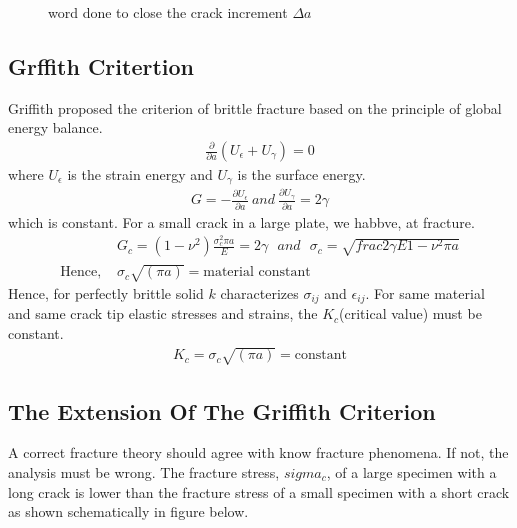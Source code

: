 \documentclass[11pt]{article}
\begin{document}
\begin{figure}[H]
    \centering
    \captionsetup{labelformat=empty}
    \caption{word done to close the crack increment $\Delta a$}
    
\end{figure}




\subsection{Grffith Critertion}
Griffith proposed the criterion of brittle fracture based on the principle of global energy balance.
\begin{align}
    \frac{\partial}{\partial a}(U_\epsilon + U_\gamma) = 0 \tag{5} \label{5}
\end{align}
where $U_\epsilon$  is the strain energy and $U_\gamma$ is the surface energy.
\begin{align*}
    G = -\frac{\partial U_\epsilon}{\partial a} \ and \ \frac{\partial U_\gamma}{\partial a} = 2 \gamma
\end{align*}
which is constant. For a small crack in a large plate, we habbve, at fracture.
\begin{align*}
    &G_c = (1 - \nu ^ 2)\frac{\sigma_{c} ^ 2 \pi a}{E} = 2 \gamma \ \ \ and \ \ \ \sigma_c = \sqrt{frac{2 \gamma E}{1 - \nu ^ 2 } \pi a}
    \\\text{Hence, \ \ \ \ \ \ \ \ \ \ \ \ \ } & \sigma_c \sqrt{(\pi a)} = \text{material constant}
\end{align*}
Hence, for perfectly brittle solid $k$ characterizes $\sigma_{ij}$ and $\epsilon_{ij}$.
For same material and same crack tip elastic stresses and strains, the $K_c$(critical value) must be constant.
\begin{align*}
    K_c = \sigma_c \sqrt{(\pi a)} = \text {constant}
\end{align*}

\subsection{The Extension Of The Griffith Criterion}
A correct fracture theory should agree with know fracture phenomena. If not, the analysis must 
be wrong. The fracture stress, $sigma_c$, of a large specimen with a long crack is lower
than the fracture stress of a small specimen with a short crack as shown schematically in figure
below.
\end{document}
